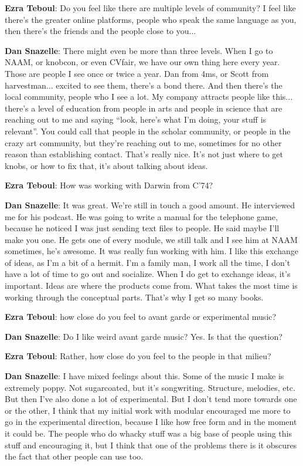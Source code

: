 \textbf{Ezra Teboul}: Do you feel like there are multiple levels of community? I feel like there's the greater online platforms, people who speak the same language as you, then there's the friends and the people close to you...

\textbf{Dan Snazelle}: There might even be more than three levels. When I go to NAAM, or knobcon, or even CVfair, we have our own thing here every year. Those are people I see once or twice a year. Dan from 4ms, or Scott from harvestman... excited to see them, there's a bond there. And then there's the local community, people who I see a lot. My company attracts people like this... there's a level of education from people in arts and people in science that are reaching out to me and saying ``look, here's what I'm doing, your stuff is relevant''. You could call that people in the scholar community, or people in the crazy art community, but they're reaching out to me, sometimes for no other reason than establishing contact. That's really nice. It's not just where to get knobs, or how to fix that, it's about talking about ideas. 

\textbf{Ezra Teboul}: How was working with Darwin from C'74?

\textbf{Dan Snazelle}: It was great. We're still in touch a good amount. He interviewed me for his podcast. He was going to write a manual for the telephone game, because he noticed I was just sending text files to people. He said maybe I'll make you one. He gets one of every module, we still talk and I see him at NAAM sometimes, he's awesome. It was really fun working with him. I like this exchange of ideas, as I'm a bit of a hermit. I'm a family man, I work all the time, I don't have a lot of time to go out and socialize. When I do get to exchange ideas, it's important. Ideas are where the products come from. What takes the most time is working through the conceptual parts. That's why I get so many books. 

\textbf{Ezra Teboul}: how close do you feel to avant garde or experimental music? 

\textbf{Dan Snazelle}: Do I like weird avant garde music? Yes. Is that the question? 

\textbf{Ezra Teboul}: Rather, how close do you feel to the people in that milieu?

\textbf{Dan Snazelle}: I have mixed feelings about this. Some of the music I make is extremely poppy. Not sugarcoated, but it's songwriting. Structure, melodies, etc. But then I've also done a lot of experimental. But I don't tend more towards one or the other, I think that my initial work with modular encouraged me more to go in the experimental direction, because I like how free form and in the moment it could be. The people who do whacky stuff was a big base of people using this stuff and encouraging it, but I think that one of the problems there is it obscures the fact that other people can use too. 

